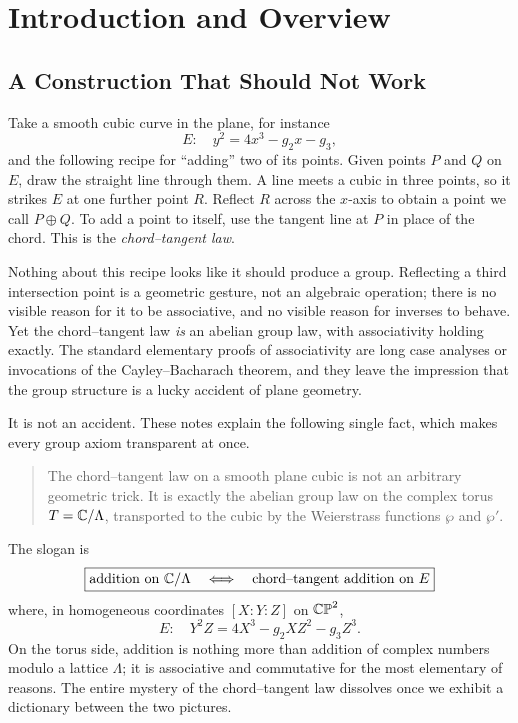 \chapter{Introduction and Overview}
\label{ch:intro}

\section{A Construction That Should Not Work}
\label{sec:intro-construction}

Take a smooth cubic curve in the plane, for instance
\[
  E:\quad y^2 = 4x^3 - g_2 x - g_3,
\]
and the following recipe for ``adding'' two of its points. Given points
\(P\) and \(Q\) on \(E\), draw the straight line through them. A line meets a
cubic in three points, so it strikes \(E\) at one further point \(R\). Reflect
\(R\) across the \(x\)-axis to obtain a point we call \(P \oplus Q\). To add a
point to itself, use the tangent line at \(P\) in place of the chord. This is
the \emph{chord--tangent law}.

Nothing about this recipe looks like it should produce a group. Reflecting a
third intersection point is a geometric gesture, not an algebraic operation;
there is no visible reason for it to be associative, and no visible reason for
inverses to behave. Yet the chord--tangent law \emph{is} an abelian group law,
with associativity holding exactly. The standard elementary proofs of
associativity are long case analyses or invocations of the Cayley--Bacharach
theorem, and they leave the impression that the group structure is a lucky
accident of plane geometry.

It is not an accident. These notes explain the following single fact, which
makes every group axiom transparent at once.

\begin{quote}
The chord--tangent law on a smooth plane cubic is not an arbitrary geometric
trick. It is exactly the abelian group law on the complex torus
\(T = \mathbb{C}/\Lambda\), transported to the cubic by the Weierstrass functions
\(\wp\) and \(\wp'\).
\end{quote}

The slogan is
\[
  \boxed{
    \text{addition on } \mathbb{C}/\Lambda
    \quad\Longleftrightarrow\quad
    \text{chord--tangent addition on } E
  }
\]
where, in homogeneous coordinates \([X:Y:Z]\) on \(\mathbb{CP}^2\),
\[
  E:\quad Y^2 Z = 4X^3 - g_2 X Z^2 - g_3 Z^3 .
\]
On the torus side, addition is nothing more than addition of complex numbers
modulo a lattice \(\Lambda\); it is associative and commutative for the most
elementary of reasons. The entire mystery of the chord--tangent law dissolves
once we exhibit a dictionary between the two pictures.

